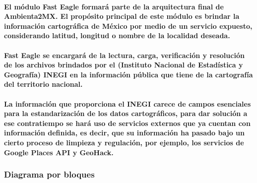       \paragraph{El módulo Fast Eagle formará parte de la arquitectura final de Ambienta2MX. El propósito principal de este módulo es brindar la información cartográfica de México por medio de un servicio expuesto, considerando latitud, longitud o nombre de la localidad deseada.}
      \paragraph{Fast Eagle se encargará de la lectura, carga, verificación y resolución de los archivos brindados por el (Instituto Nacional de Estadística y Geografía) INEGI en la información pública que tiene de la cartografía del territorio nacional.}
      \paragraph{La información que proporciona el INEGI carece de campos esenciales para la estandarización de los datos cartográficos, para dar solución a ese contratiempo se hará uso de servicios externos que ya cuentan con información definida, es decir, que su información ha pasado bajo un cierto proceso de limpieza y regulación, por ejemplo, los servicios de Google Places API y GeoHack.}
    \subsubsection{Diagrama por bloques}

